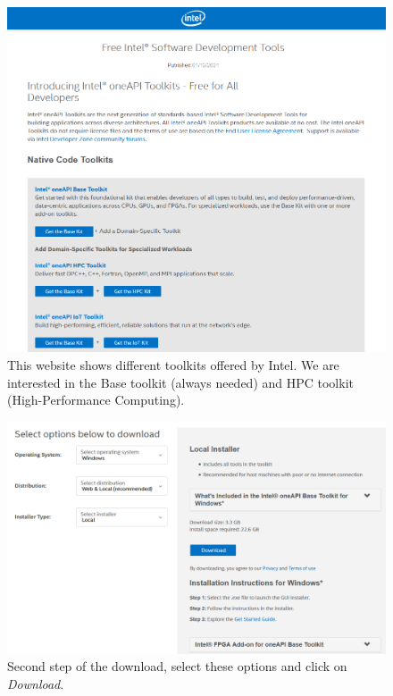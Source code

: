 \begin{figure}
    \centering
    \includegraphics[width=\textwidth]{Figures/Proceso2A}
    \caption{This website shows different toolkits offered by Intel. We are interested in the Base toolkit (always needed) and HPC toolkit (High-Performance Computing).}
    \label{fig:Proceso2A}
\end{figure}

\begin{figure}
    \centering
    \includegraphics[width=  \textwidth]{Figures/Proceso2B}
    \caption{Second step of the download, select these options and click on \textit{Download}.}
    \label{fig:Proceso2B}
\end{figure}

